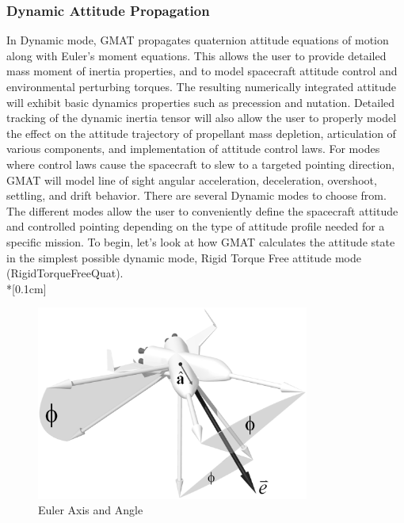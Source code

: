 \subsubsection{Dynamic Attitude Propagation}
In Dynamic mode, GMAT propagates quaternion attitude equations of motion along
with Euler's moment equations.  This allows the user to provide detailed mass
moment of inertia properties, and to model spacecraft attitude control and
environmental perturbing torques.  The resulting numerically integrated attitude
will exhibit basic dynamics properties such as precession and nutation.
Detailed tracking of the dynamic inertia tensor will also allow the user to
properly model the effect on the attitude trajectory of propellant mass
depletion, articulation of various components, and implementation of attitude
control laws.  For modes where control laws cause the spacecraft to slew to a
targeted pointing direction, GMAT will model line of sight angular acceleration,
deceleration, overshoot, settling, and drift behavior.  There are several
Dynamic modes to choose from.  The different modes allow the user to
conveniently define the spacecraft attitude and controlled pointing depending on
the type of attitude profile needed for a specific mission.  To begin, let's
look at how GMAT calculates the attitude state in the simplest possible dynamic
mode, Rigid Torque Free attitude mode (RigidTorqueFreeQuat).\\*[0.1cm]
%
\vspace{-0.2 in}
\begin{figure}[htb]
    \begin{center}
    \includegraphics[width=0.8\textwidth]{Images/QuaternionX42DefB&W}
    \caption{ Euler Axis and Angle} \label{fig:EulerAxisAndAngle}
    \end{center}
\end{figure}
%
